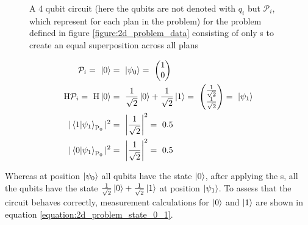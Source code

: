 \begin{figure}[!h]
    \centering
    \caption{A 4 qubit circuit (here the qubits are not denoted with $q_i$ but $\mathcal{P}_i$, which represent for each plan in the problem) for the problem defined in figure \ref{figure:2d_problem_data} consisting of only \hgate s to create an equal superposition across all plans}
    \label{figure:4_qubit_circuit_with_h_gates}
\end{figure}

\begin{equation}
    \centering
    \begin{split}
        \mathcal{P}_i =\ \ket{0} &=\ \ket{\psi_0} =\ \begin{pmatrix}1 \\ 0\end{pmatrix}\\
        \mathrm{H}\mathcal{P}_i =\ \mathrm{H}\ket{0} &=\ \frac{1}{\sqrt{2}}\ket{0} + \frac{1}{\sqrt{2}}\ket{1} =\ \begin{pmatrix}\frac{1}{\sqrt{2}} \\ \frac{1}{\sqrt{2}}\end{pmatrix} =\ \ket{\psi_1}\\
        |\bra{1}\ket{\psi_1}_{\mathrm{P}_0}|^2 &=\ \left|\frac{1}{\sqrt{2}}\right|^2 =\ 0.5\\
        |\bra{0}\ket{\psi_1}_{\mathrm{P}_0}|^2 &=\ \left|\frac{1}{\sqrt{2}}\right|^2 =\ 0.5\\
    \end{split}
    \label{equation:2d_problem_state_0_1}
\end{equation}

Whereas at position $\ket{\psi_0}$ all qubits have the state $\ket{0}$, after applying the \hgate s, all the qubits have the state $\frac{1}{\sqrt{2}}\ket{0} + \frac{1}{\sqrt{2}}\ket{1}$ at position $\ket{\psi_1}$. To assess that the circuit behaves correctly, measurement calculations for $\ket{0}$ and $\ket{1}$ are shown in equation \ref{equation:2d_problem_state_0_1}. 

